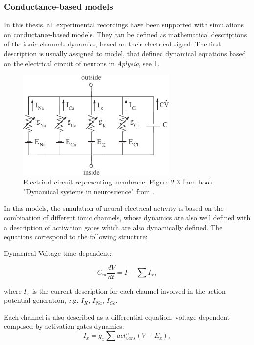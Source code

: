 \subsubsection{Conductance-based models}

In this thesis, all experimental recordings have been supported with simulations on conductance-based models. They can be defined as mathematical descriptions of the ionic channels dynamics, based on their electrical signal. The first description is usually assigned to \cite{hodgkin_quantitative_1952} model, that defined dynamical equations based on the electrical circuit of neurons in \textit{Aplysia}, see \ref{fig:electrical circuit}.

\begin{figure}[htb!]
	\centering
	\includegraphics[width=0.7\textwidth]{./img/intro/dns_neuron_circuit.pdf}
	\caption{Electrical circuit representing membrane. Figure 2.3 from book "Dynamical systems in neuroscience" from \cite{izhikevich_dynamical_2007}.}
	\label{fig:electrical circuit}
\end{figure}

In this models, the simulation of neural electrical activity is based on the combination of different ionic channels, whose dynamics are also well defined with a description of activation gates which are also dynamically defined. The equations correspond to the following structure:

Dynamical Voltage time dependent:

\begin{equation}
 C_m \frac{dV}{dt} = I - \sum I_{x},
\end{equation}

where $I_{x}$ is the current description for each channel involved in the action potential generation, e.g. $I_K$, $I_{Na}$, $I_{Ca}$.

Each channel is also described as a differential equation, voltage-dependent composed by activation-gates dynamics:
\begin{equation}
I_x =  g_x \sum act_{vars}^n (V - E_x), 
\end{equation}

